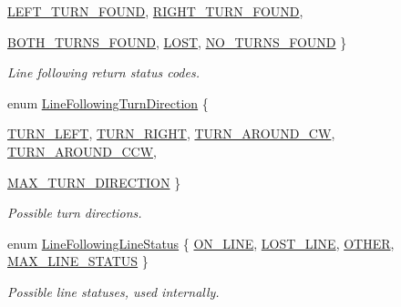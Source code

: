 \begin{DoxyCompactItemize}
\hyperlink{namespaceIDP_a5993bdfdd901fc5521c8df42dca43bd0a38cd4116cdddd4aa99a78dd5c3b37ed6}{LEFT\_\-TURN\_\-FOUND}, 
\hyperlink{namespaceIDP_a5993bdfdd901fc5521c8df42dca43bd0a4e943d3404f29cc547855d1097727e63}{RIGHT\_\-TURN\_\-FOUND}, 
\par
\hyperlink{namespaceIDP_a5993bdfdd901fc5521c8df42dca43bd0adb771c4661fabd68ed4c31c504088e93}{BOTH\_\-TURNS\_\-FOUND}, 
\hyperlink{namespaceIDP_a5993bdfdd901fc5521c8df42dca43bd0ab68c7dd029c69ce53f446acabd19455c}{LOST}, 
\hyperlink{namespaceIDP_a5993bdfdd901fc5521c8df42dca43bd0aaa2e9a813db91657570cf2eeb78d0983}{NO\_\-TURNS\_\-FOUND}
 \}
\begin{DoxyCompactList}\small\item\em Line following return status codes. \item\end{DoxyCompactList}\item 
enum \hyperlink{namespaceIDP_aba52d8ae6ecf9eb4c7edb518bcc02544}{LineFollowingTurnDirection} \{ \par
\hyperlink{namespaceIDP_aba52d8ae6ecf9eb4c7edb518bcc02544a999d44c9ef45538375c7b316d0a51059}{TURN\_\-LEFT}, 
\hyperlink{namespaceIDP_aba52d8ae6ecf9eb4c7edb518bcc02544a630a2f356cbbe3205557ed0f82f25eec}{TURN\_\-RIGHT}, 
\hyperlink{namespaceIDP_aba52d8ae6ecf9eb4c7edb518bcc02544af2abadf838c7b083430a3671c9831990}{TURN\_\-AROUND\_\-CW}, 
\hyperlink{namespaceIDP_aba52d8ae6ecf9eb4c7edb518bcc02544a10a1f928d94973b92dcebf2e79858e92}{TURN\_\-AROUND\_\-CCW}, 
\par
\hyperlink{namespaceIDP_aba52d8ae6ecf9eb4c7edb518bcc02544aa74bb750e694576bc85d62d37534d22e}{MAX\_\-TURN\_\-DIRECTION}
 \}
\begin{DoxyCompactList}\small\item\em Possible turn directions. \item\end{DoxyCompactList}\item 
enum \hyperlink{namespaceIDP_ac3688e4c6bc9b671b09672d71ebccc40}{LineFollowingLineStatus} \{ \hyperlink{namespaceIDP_ac3688e4c6bc9b671b09672d71ebccc40ae98c6f22ce3cb9115070fa63dc53be54}{ON\_\-LINE}, 
\hyperlink{namespaceIDP_ac3688e4c6bc9b671b09672d71ebccc40a6d73c89419d3f6d4b5816b31ed4a1d50}{LOST\_\-LINE}, 
\hyperlink{namespaceIDP_ac3688e4c6bc9b671b09672d71ebccc40a01ca34a0cd3291e4677952ffa87bdf05}{OTHER}, 
\hyperlink{namespaceIDP_ac3688e4c6bc9b671b09672d71ebccc40a7f43bbf697f9db6ab9a5f8f09cab156b}{MAX\_\-LINE\_\-STATUS}
 \}
\begin{DoxyCompactList}\small\item\em Possible line statuses, used internally. \item\end{DoxyCompactList}\item 

\end{DoxyCompactItemize}

